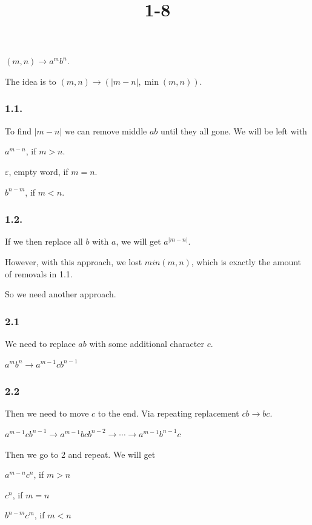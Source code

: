\documentclass{article}
\title{1-8}
\begin{document}
\maketitle

\( (m, n) \to a^mb^n \).

The idea is to \( (m, n) \to (|m - n|, \min(m, n)) \).

\subsubsection*{1.1.}

To find \( | m - n | \) we can remove middle \( ab \) until they all gone. We will be left with

\item \( a^{m-n} \), if \( m > n \).
\item \( \varepsilon \), empty word, if \( m = n \).
\item \( b^{n-m} \), if \( m < n \).

\subsubsection*{1.2.}

If we then replace all \( b \) with \( a \), we will get \( a^{|m-n|} \).

However, with this approach, we lost \( min(m, n) \), which is exactly the amount of removals in 1.1.

So we need another approach.

\subsubsection*{2.1}

We need to replace \( ab \) with some additional character \( c \).

\( a^mb^n \to a^{m-1}cb^{n-1} \)

\subsubsection*{2.2}

Then we need to move \( c \) to the end. Via repeating replacement \( cb \to bc \).

\( a^{m-1}cb^{n-1} \to a^{m-1}bcb^{n-2} \to \cdots \to a^{m-1}b^{n-1}c \)

Then we go to 2 and repeat. We will get

\item \( a^{m-n}c^n \), if \( m > n \)
\item \( c^n \), if \( m = n \)
\item \( b^{n-m}c^m \), if \( m < n \)
\end{document}
